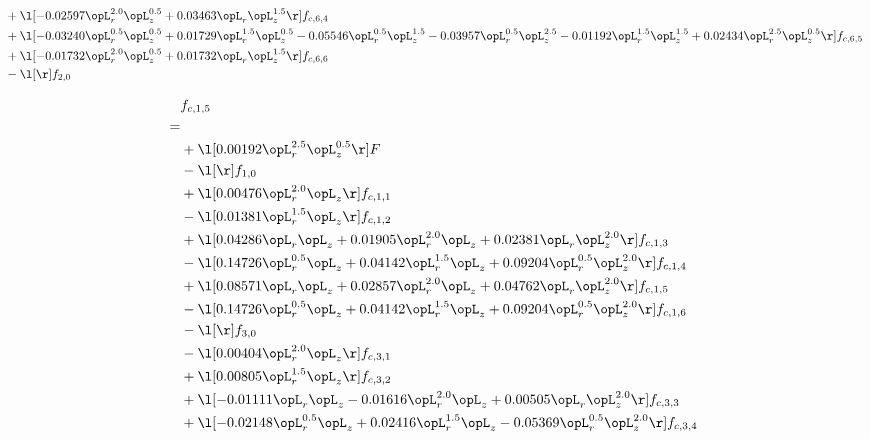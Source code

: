 \begin{alignat}{2}
& + \l[  -0.02597 \opL_r^{2.0} \opL_z^{0.5} +  0.03463 \opL_r \opL_z^{1.5}  \r] f_{c,6,4} \nonumber \\ 
& + \l[  -0.03240 \opL_r^{0.5} \opL_z^{0.5} +  0.01729 \opL_r^{1.5} \opL_z^{0.5}   -0.05546 \opL_r^{0.5} \opL_z^{1.5}   -0.03957 \opL_r^{0.5} \opL_z^{2.5}   -0.01192 \opL_r^{1.5} \opL_z^{1.5} +  0.02434 \opL_r^{2.5} \opL_z^{0.5}  \r] f_{c,6,5} \nonumber \\ 
& + \l[  -0.01732 \opL_r^{2.0} \opL_z^{0.5} +  0.01732 \opL_r \opL_z^{1.5}  \r] f_{c,6,6} \nonumber \\ 
& - \l[  \r] f_{2,0} \nonumber \\ 
\end{alignat} 


\begin{alignat}{2} 
\label{eq:f_15_1} 
& f_{c,1,5} \nonumber \\ 
 = \\ 
& + \l[  0.00192 \opL_r^{2.5} \opL_z^{0.5}  \r] F \nonumber \\ 
& - \l[  \r] f_{1,0} \nonumber \\ 
& + \l[  0.00476 \opL_r^{2.0} \opL_z  \r] f_{c,1,1} \nonumber \\ 
& - \l[  0.01381 \opL_r^{1.5} \opL_z  \r] f_{c,1,2} \nonumber \\ 
& + \l[  0.04286 \opL_r \opL_z +  0.01905 \opL_r^{2.0} \opL_z +  0.02381 \opL_r \opL_z^{2.0}  \r] f_{c,1,3} \nonumber \\ 
& - \l[  0.14726 \opL_r^{0.5} \opL_z +  0.04142 \opL_r^{1.5} \opL_z +  0.09204 \opL_r^{0.5} \opL_z^{2.0}  \r] f_{c,1,4} \nonumber \\ 
& + \l[  0.08571 \opL_r \opL_z +  0.02857 \opL_r^{2.0} \opL_z +  0.04762 \opL_r \opL_z^{2.0}  \r] f_{c,1,5} \nonumber \\ 
& - \l[  0.14726 \opL_r^{0.5} \opL_z +  0.04142 \opL_r^{1.5} \opL_z +  0.09204 \opL_r^{0.5} \opL_z^{2.0}  \r] f_{c,1,6} \nonumber \\ 
& - \l[  \r] f_{3,0} \nonumber \\ 
& - \l[  0.00404 \opL_r^{2.0} \opL_z  \r] f_{c,3,1} \nonumber \\ 
& + \l[  0.00805 \opL_r^{1.5} \opL_z  \r] f_{c,3,2} \nonumber \\ 
& + \l[  -0.01111 \opL_r \opL_z   -0.01616 \opL_r^{2.0} \opL_z +  0.00505 \opL_r \opL_z^{2.0}  \r] f_{c,3,3} \nonumber \\ 
& + \l[  -0.02148 \opL_r^{0.5} \opL_z +  0.02416 \opL_r^{1.5} \opL_z   -0.05369 \opL_r^{0.5} \opL_z^{2.0}  \r] f_{c,3,4} \nonumber \\ 

\end{alignat}
